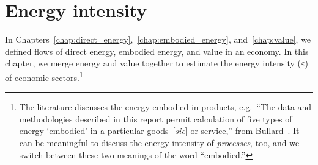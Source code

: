 %
%
%

\chapter{Energy intensity}
\label{chap:intensity} 





In Chapters~\ref{chap:direct_energy},~\ref{chap:embodied_energy}, and~\ref{chap:value}, 
we defined flows of direct energy, embodied energy, and value in an economy.
In this chapter, we merge energy and value together to estimate
the energy intensity ($\varepsilon$) of economic sectors.\footnote{The literature discusses 
the energy embodied in products, e.g.\ ``The data and methodologies described in this report 
permit calculation of five types of energy `embodied' 
in a particular goods~[\emph{sic}] or service,'' %
from Bullard~\cite[p.~268]{Bullard:1978vd}. 
It can be meaningful to discuss the energy intensity of \emph{processes}, too,
and we switch between these two meanings of the word ``embodied.''}


